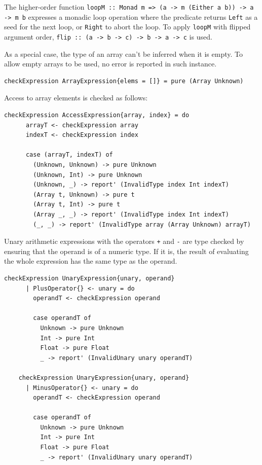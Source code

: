 \documentclass[UdineBachThesis,american,11pt]{PhdThesis}
\begin{document}
  The higher-order function
  \mbox{\texttt{loopM :: Monad m => (a -> m (Either a b)) -> a -> m b}}
  expresses a monadic loop operation where the predicate returns
  \mbox{\texttt{Left}} as a seed for the next loop, or \mbox{\texttt{Right}} to
  abort the loop. To apply \mbox{\texttt{loopM}} with flipped argument order,
  \mbox{\texttt{flip :: (a -> b -> c) -> b -> a -> c}} is used.

  As a special case, the type of an array can't be inferred when it is empty. To
  allow empty arrays to be used, no error is reported in such instance.

  \begin{Verbatim}[gobble=4,fontsize=\small]
    checkExpression ArrayExpression{elems = []} = pure (Array Unknown)
  \end{Verbatim}

  Access to array elements is checked as follows:

  \begin{Verbatim}[gobble=4,fontsize=\small]
    checkExpression AccessExpression{array, index} = do
      arrayT <- checkExpression array
      indexT <- checkExpression index

      case (arrayT, indexT) of
        (Unknown, Unknown) -> pure Unknown
        (Unknown, Int) -> pure Unknown
        (Unknown, _) -> report' (InvalidType index Int indexT)
        (Array t, Unknown) -> pure t
        (Array t, Int) -> pure t
        (Array _, _) -> report' (InvalidType index Int indexT)
        (_, _) -> report' (InvalidType array (Array Unknown) arrayT)
  \end{Verbatim}

  Unary arithmetic expressions with the operators \texttt{+} and \texttt{-} are
  type checked by ensuring that the operand is of a numeric type. If it is, the
  result of evaluating the whole expression has the same type as the operand.

  \begin{Verbatim}[gobble=4,fontsize=\small]
    checkExpression UnaryExpression{unary, operand}
      | PlusOperator{} <- unary = do
        operandT <- checkExpression operand

        case operandT of
          Unknown -> pure Unknown
          Int -> pure Int
          Float -> pure Float
          _ -> report' (InvalidUnary unary operandT)

    checkExpression UnaryExpression{unary, operand}
      | MinusOperator{} <- unary = do
        operandT <- checkExpression operand

        case operandT of
          Unknown -> pure Unknown
          Int -> pure Int
          Float -> pure Float
          _ -> report' (InvalidUnary unary operandT)
  \end{Verbatim}
\end{document}
